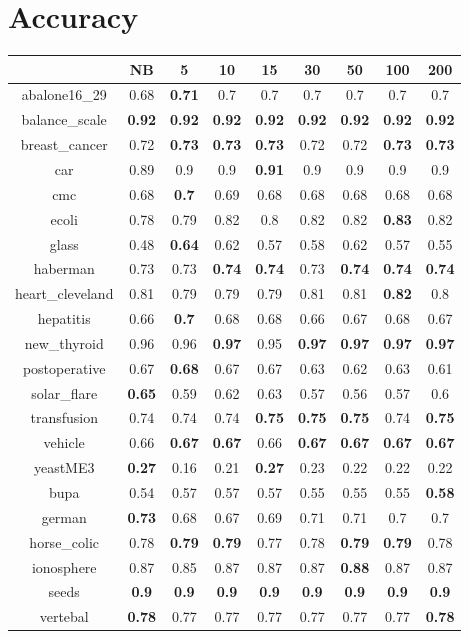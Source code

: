 \documentclass{article}%
\begin{document}
%
\normalsize%
\section*{Accuracy}%
\begin{tabular}{c|cccccccc}%
\hline%
&NB&5&10&15&30&50&100&200\\%
\hline%
abalone16\_29&0.68&\textbf{0.71}&0.7&0.7&0.7&0.7&0.7&0.7\\%
\hline%
balance\_scale&\textbf{0.92}&\textbf{0.92}&\textbf{0.92}&\textbf{0.92}&\textbf{0.92}&\textbf{0.92}&\textbf{0.92}&\textbf{0.92}\\%
\hline%
breast\_cancer&0.72&\textbf{0.73}&\textbf{0.73}&\textbf{0.73}&0.72&0.72&\textbf{0.73}&\textbf{0.73}\\%
\hline%
car&0.89&0.9&0.9&\textbf{0.91}&0.9&0.9&0.9&0.9\\%
\hline%
cmc&0.68&\textbf{0.7}&0.69&0.68&0.68&0.68&0.68&0.68\\%
\hline%
ecoli&0.78&0.79&0.82&0.8&0.82&0.82&\textbf{0.83}&0.82\\%
\hline%
glass&0.48&\textbf{0.64}&0.62&0.57&0.58&0.62&0.57&0.55\\%
\hline%
haberman&0.73&0.73&\textbf{0.74}&\textbf{0.74}&0.73&\textbf{0.74}&\textbf{0.74}&\textbf{0.74}\\%
\hline%
heart\_cleveland&0.81&0.79&0.79&0.79&0.81&0.81&\textbf{0.82}&0.8\\%
\hline%
hepatitis&0.66&\textbf{0.7}&0.68&0.68&0.66&0.67&0.68&0.67\\%
\hline%
new\_thyroid&0.96&0.96&\textbf{0.97}&0.95&\textbf{0.97}&\textbf{0.97}&\textbf{0.97}&\textbf{0.97}\\%
\hline%
postoperative&0.67&\textbf{0.68}&0.67&0.67&0.63&0.62&0.63&0.61\\%
\hline%
solar\_flare&\textbf{0.65}&0.59&0.62&0.63&0.57&0.56&0.57&0.6\\%
\hline%
transfusion&0.74&0.74&0.74&\textbf{0.75}&\textbf{0.75}&\textbf{0.75}&0.74&\textbf{0.75}\\%
\hline%
vehicle&0.66&\textbf{0.67}&\textbf{0.67}&0.66&\textbf{0.67}&\textbf{0.67}&\textbf{0.67}&\textbf{0.67}\\%
\hline%
yeastME3&\textbf{0.27}&0.16&0.21&\textbf{0.27}&0.23&0.22&0.22&0.22\\%
\hline%
bupa&0.54&0.57&0.57&0.57&0.55&0.55&0.55&\textbf{0.58}\\%
\hline%
german&\textbf{0.73}&0.68&0.67&0.69&0.71&0.71&0.7&0.7\\%
\hline%
horse\_colic&0.78&\textbf{0.79}&\textbf{0.79}&0.77&0.78&\textbf{0.79}&\textbf{0.79}&0.78\\%
\hline%
ionosphere&0.87&0.85&0.87&0.87&0.87&\textbf{0.88}&0.87&0.87\\%
\hline%
seeds&\textbf{0.9}&\textbf{0.9}&\textbf{0.9}&\textbf{0.9}&\textbf{0.9}&\textbf{0.9}&\textbf{0.9}&\textbf{0.9}\\%
\hline%
vertebal&\textbf{0.78}&0.77&0.77&0.77&0.77&0.77&0.77&\textbf{0.78}\\%
\hline%
\end{tabular}
\end{document}
